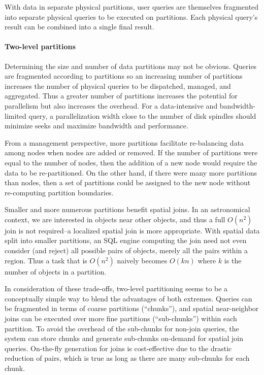 \documentclass[DM,lsstdraft,toc]{lsstdoc}
\begin{document}
With data in separate physical partitions, user queries are themselves
fragmented into separate physical queries to be executed on partitions.
Each physical query's result can be combined into a single final result.

\paragraph{Two-level partitions}\label{two-level-partitions}

Determining the size and number of data partitions may not be obvious.
Queries are fragmented according to partitions so an increasing number
of partitions increases the number of physical queries to be dispatched,
managed, and aggregated. Thus a greater number of partitions increases
the potential for parallelism but also increases the overhead. For a
data-intensive and bandwidth-limited query, a parallelization width
close to the number of disk spindles should minimize seeks and
maximize bandwidth and performance.

From a management perspective, more partitions facilitate re-balancing
data among nodes when nodes are added or removed. If the number of
partitions were equal to the number of nodes, then the addition of a new
node would require the data to be re-partitioned. On the other hand, if
there were many more partitions than nodes, then a set of partitions
could be assigned to the new node without re-computing partition
boundaries.

Smaller and more numerous partitions benefit spatial joins. In an
astronomical context, we are interested in objects near other objects,
and thus a full \(O(n^2)\) join is not required--a localized spatial
join is more appropriate. With spatial data split into smaller
partitions, an SQL engine computing the join need not even consider (and
reject) all possible pairs of objects, merely all the pairs within a
region. Thus a task that is \(O(n^2)\) naively becomes \(O(kn)\) where
\(k\) is the number of objects in a partition.

In consideration of these trade-offs, two-level partitioning seems to be
a conceptually simple way to blend the advantages of both extremes.
Queries can be fragmented in terms of coarse partitions (``chunks''),
and spatial near-neighbor joins can be executed over more fine
partitions (``sub-chunks'') within each partition. To avoid the overhead
of the sub-chunks for non-join queries, the system can store chunks and
generate sub-chunks on-demand for spatial join queries. On-the-fly
generation for joins is cost-effective due to the drastic reduction of
pairs, which is true as long as there are many sub-chunks for each
chunk.
\end{document}
